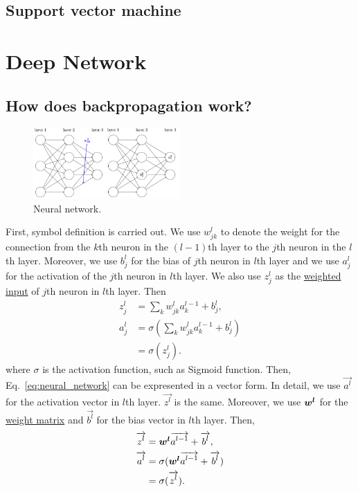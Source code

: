 \documentclass[10pt,onecolumn]{book}
\newcommand{\bm}[1]{\mbox{\boldmath{$#1$}}}
\begin{document}
\section{Support vector machine}


\chapter{Deep Network}
\section{How does backpropagation work?}
\begin{figure}[h]
\centering
\includegraphics[width=0.5\textwidth]{figures/neural_network.png}
\caption{Neural network.}
\end{figure}
First, symbol definition is carried out. We use $w^l_{jk}$ to denote the weight for the connection from the $k$th neuron in the $(l - 1)$th layer to the $j$th neuron in the $l$th layer. Moreover, we use $b^l_j$ for the bias of $j$th neuron in $l$th layer and we use $a^l_j$ for the activation of the $j$th neuron in $l$th layer. We also use $z^l_j$ as the \uline{weighted input}  of $j$th neuron in $l$th layer. Then
\begin{equation}
\begin{split}
z^l_j & = \sum_k w^l_{jk} a^{l - 1} _ k + b^l_j, \\
a^l_j & = \sigma(\sum_k w^l_{jk} a^{l - 1} _ k + b^l_j) \\
	  & = \sigma(z^l_j).
\end{split}
\label{eq:neural_network}
\end{equation}
where $\sigma$ is the activation function, such as Sigmoid function. Then, Eq.~\ref{eq:neural_network} can be expresented in a vector form. In detail, we use $\vec{a^l}$ for the activation vector in $l$th layer. $\vec{z^l}$ is the same. Moreover, we use $\bm{w^l}$ for the \uline{weight matrix} and $\vec{b^l}$ for the bias vector in $l$th layer. Then, 
\begin{equation}
\begin{split}
\overrightarrow{z^l} & = \bm{w^l}\overrightarrow{a^{l - 1}} + \overrightarrow{b^l}, \\
\overrightarrow{a^l} & = \sigma(\bm{w^l}\overrightarrow{a^{l - 1}} + \overrightarrow{b^l}) \\
		  & = \sigma(\overrightarrow{z^l}).
\end{split}
\end{equation}
\end{document}
